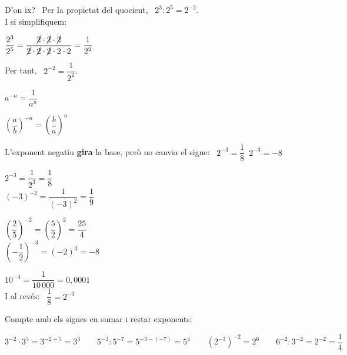 \documentclass[11pt,a4paper]{article}
\newcommand{\be}[1]{{\color{fmok}\faCheckCircle}\ \ensuremath{#1}}
\newcommand{\mal}[1]{{\color{fmR}\faTimesCircle}\ {\color{fmR}\ensuremath{#1}}}
\begin{document}
\begin{minipage}[c]{0.5\linewidth}
D'on ix? \ Per la propietat del quocient, \ $2^{3}:2^{5}=2^{-2}$.\\ I si simplifiquem:\par\smallskip
{\centering$\dfrac{2^{3}}{2^{5}}=\dfrac{\cancel{2}\cdot\cancel{2}\cdot\cancel{2}}{\cancel{2}\cdot\cancel{2}\cdot\cancel{2}\cdot2\cdot2}=\dfrac{1}{2^{2}}$\par}\smallskip
Per tant, \ $2^{-2}=\dfrac{1}{2^{2}}$.
\end{minipage}\hfill
\begin{minipage}[c]{0.46\linewidth}
\begin{tcolorbox}[enhanced,colback=fmyellow!18,colframe=fmgold,arc=4mm,boxrule=1.6pt,before upper=\centering,top=3mm,bottom=3mm]
{\Large$a^{-n}=\dfrac{1}{a^{n}}$}\par\medskip
{\Large$\left(\dfrac{a}{b}\right)^{-n}=\left(\dfrac{b}{a}\right)^{n}$}
\end{tcolorbox}
\end{minipage}

\begin{compte}
L'exponent negatiu \textbf{gira} la base, però no canvia el signe: \qquad \be{2^{-3}=\dfrac18}\qquad \mal{2^{-3}=-8}
\end{compte}

\begin{exemple}[Exemples]
\begin{minipage}[t]{0.32\linewidth}
$2^{-3}=\dfrac{1}{2^{3}}=\dfrac18$\\[5pt]
$(-3)^{-2}=\dfrac{1}{(-3)^{2}}=\dfrac19$
\end{minipage}\hfill
\begin{minipage}[t]{0.32\linewidth}
$\left(\dfrac25\right)^{-2}=\left(\dfrac52\right)^{2}=\dfrac{25}{4}$\\[5pt]
$\left(-\dfrac12\right)^{-3}=(-2)^{3}=-8$
\end{minipage}\hfill
\begin{minipage}[t]{0.32\linewidth}
$10^{-4}=\dfrac{1}{10\,000}=0{,}0001$\\[5pt]
I al revés: \ $\dfrac18=2^{-3}$
\end{minipage}
\end{exemple}

\begin{idea}
Compte amb els signes en sumar i restar exponents:\\[4pt]
{\centering$3^{-2}\cdot3^{5}=3^{-2+5}=3^{3}\qquad 5^{-3}:5^{-7}=5^{-3-(-7)}=5^{4}\qquad \left(2^{-3}\right)^{-2}=2^{6}\qquad 6^{-2}:3^{-2}=2^{-2}=\dfrac14$\par}
\end{idea}
\end{document}
